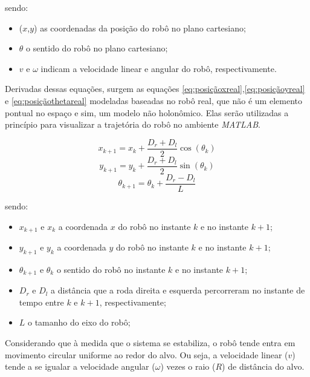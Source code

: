 sendo:
\begin{itemize}
	\item ($x$,$y$) as coordenadas da posição do robô no plano cartesiano;
	\item $\theta$ o sentido do robô no plano cartesiano;
	\item $v$ e $\omega$ indicam a velocidade linear e angular do robô, respectivamente.	
\end{itemize}

Derivadas dessas equações, surgem as equações \ref*{eq:posiçãoxreal},\ref*{eq:posiçãoyreal} e \ref*{eq:posiçãothetareal} modeladas baseadas no robô real, que não é um elemento pontual no espaço e sim, um modelo não holonômico. Elas serão utilizadas a princípio para visualizar a trajetória do robô no ambiente \emph{MATLAB}.

\begin{equation}
x_{k+1} = x_{k} + \dfrac{D_{r} + D_{l}}{2}\cos(\theta_{k}) 
\label{eq:posiçãoxreal}
\end{equation}
\begin{equation}
y_{k+1} = y_{k} + \dfrac{D_{r} + D_{l}}{2}\sin(\theta_{k}) 
\label{eq:posiçãoyreal}
\end{equation}
\begin{equation}
\theta_{k+1} = \theta_{k} + \dfrac{D_{r} - D_{l}}{L}
\label{eq:posiçãothetareal}
\end{equation}

sendo:
\begin{itemize}
	\item $x_{k+1}$ e $x_{k}$ a coordenada $x$ do robô no instante $k$ e no instante $k+1$;
	\item $y_{k+1}$ e $y_{k}$ a coordenada $y$ do robô no instante $k$ e no instante $k+1$;
	\item $\theta_{k+1}$ e $\theta_{k}$ o sentido do robô no instante $k$ e no instante $k+1$;	
	\item $D_{r}$ e $D_{l}$ a distância que a roda direita e esquerda percorreram no instante de tempo entre $k$ e $k+1$, respectivamente;
	\item $L$ o tamanho do eixo do robô;
\end{itemize}

Considerando que à medida que o sistema se estabiliza, o robô tende entra em movimento circular uniforme ao redor do alvo. Ou seja, a velocidade linear ($v$) tende a se igualar a velocidade angular ($\omega$) vezes o raio ($R$) de distância do alvo.


